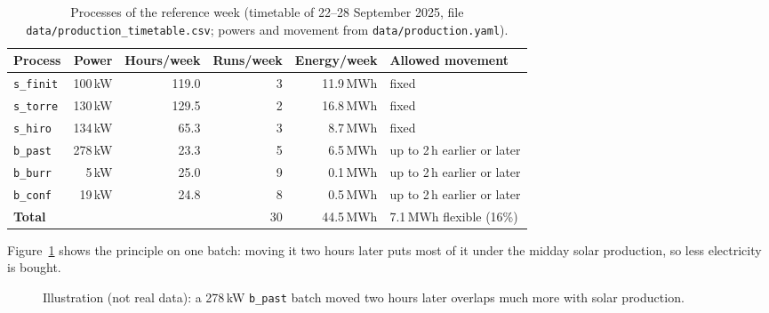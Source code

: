 \documentclass[10pt,a4paper]{scrartcl}
\begin{document}
  \begin{table}[H]
  \small
  \centering
  \renewcommand{\arraystretch}{1.15}
  \begin{tabularx}{\textwidth}{@{}L{2.2cm} R R R R L{4.2cm}@{}}
  \toprule
  \textbf{Process} & \textbf{Power} & \textbf{Hours/week} & \textbf{Runs/week} & \textbf{Energy/week} & \textbf{Allowed movement} \\
  \midrule
  \texttt{s\_finit} & 100\,kW & 119.0 & 3 & 11.9\,MWh & fixed \\
  \texttt{s\_torre} & 130\,kW & 129.5 & 2 & 16.8\,MWh & fixed \\
  \texttt{s\_hiro}  & 134\,kW & 65.3  & 3 & 8.7\,MWh  & fixed \\
  \texttt{b\_past}  & 278\,kW & 23.3  & 5 & 6.5\,MWh  & up to 2\,h earlier or later \\
  \texttt{b\_burr}  & 5\,kW   & 25.0  & 9 & 0.1\,MWh  & up to 2\,h earlier or later \\
  \texttt{b\_conf}  & 19\,kW  & 24.8  & 8 & 0.5\,MWh  & up to 2\,h earlier or later \\
  \midrule
  \textbf{Total} & & & 30 & 44.5\,MWh & 7.1\,MWh flexible (16\%) \\
  \bottomrule
  \end{tabularx}
  \caption{Processes of the reference week (timetable of 22--28 September 2025, file
  \texttt{data/production\_timetable.csv}; powers and movement from \texttt{data/production.yaml}).}
  \label{tab:processes}
  \end{table}

  Figure~\ref{fig:idea} shows the principle on one batch: moving it two hours later puts most of
  it under the midday solar production, so less electricity is bought.

  \begin{figure}[H]
  \centering
  \caption{Illustration (not real data): a 278\,kW \texttt{b\_past} batch moved two hours later
  overlaps much more with solar production.}
  \label{fig:idea}
  \end{figure}
\end{document}
